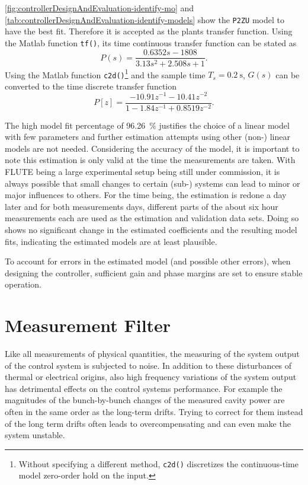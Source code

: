 \autoref{fig:controllerDesignAndEvaluation-identify-mo} and \autoref{tab:controllerDesignAndEvaluation-identify-models} show the \texttt{P2ZU} model to have the best fit. Therefore it is accepted as the plants transfer function. Using the Matlab function \texttt{tf()}, its time continuous transfer function can be stated as
\begin{equation}
P(s) = \frac{0.6352s - 1808}{3.13 s^2 + 2.508 s + 1}.
\end{equation}
Using the Matlab function \texttt{c2d()}\footnote{Without specifying a different method, \texttt{c2d()}  discretizes the continuous-time model zero-order hold on the input.} and the sample time $T_s=\SI{0.2}{\second}$, $G(s)$ can be converted to the time discrete transfer function
\begin{equation}
P[z] = \frac{-10.91 z^{-1} - 10.41 z^{-2}}{1 - 1.84 z^{-1} + 0.8519 z^{-2}}.
\end{equation}

The high model fit percentage of \SI{96.26}{\percent} justifies the choice of a linear model with few parameters and further estimation attempts using other (non-) linear models are not needed.
Considering the accuracy of the model, it is important to note this estimation is only valid at the time the measurements are taken. With FLUTE being a large experimental setup being still under commission, it is always possible that small changes to certain (sub-) systems can lead to minor or major influences to others.
For the time being, the estimation is redone a day later and for both measurements days, different parts of the about six hour measurements each are used as the estimation and validation data sets. Doing so shows no significant change in the estimated coefficients and the resulting model fits, indicating the estimated models are at least plausible.

To account for errors in the estimated model (and possible other errors), when designing the controller, sufficient gain and phase margins are set to ensure stable operation.










\newpage
\section{Measurement Filter}\label{sec:measurementFilter}
Like all measurements of physical quantities, the measuring of the system output of the control system is subjected to noise.
In addition to these disturbances of thermal or electrical origins, also high frequency variations of the system output has detrimental effects on the control systems performance.
For example the magnitudes of the bunch-by-bunch changes of the measured cavity power are often in the same order as the long-term drifts.
Trying to correct for them instead of the long term drifts often leads to overcompensating and can even make the system unstable.


